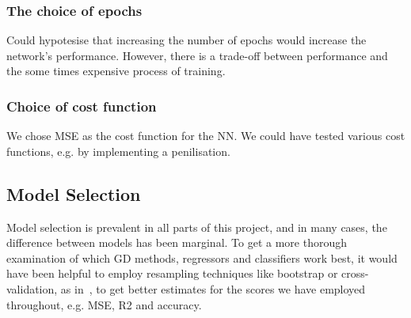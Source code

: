         \subsubsection{The choice of epochs}
            Could hypotesise that increasing the number of epochs would increase the network's performance. However, there is a trade-off between performance and the some times expensive process of training. 

        \subsubsection{Choice of cost function}
            We chose MSE as the cost function for the NN. We could have tested various cost functions, e.g. by implementing a penilisation. 

\subsection{Model Selection}
    Model selection is prevalent in all parts of this project, and in many cases, the difference between models has been marginal. To get a more thorough examination of which GD methods, regressors and classifiers work best, it would have been helpful to employ resampling techniques like bootstrap or cross-validation, as in~\citep{Project1}, to get better estimates for the scores we have employed throughout, e.g. MSE, R2 and accuracy.
